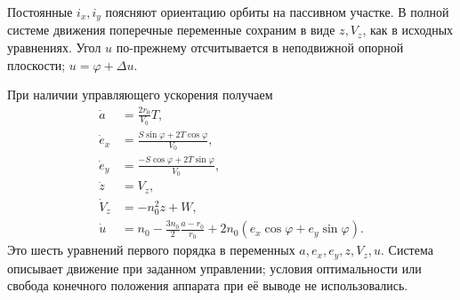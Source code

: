 \documentclass[a4paper,11pt]{article}
\numberwithin{equation}{section}
\theoremstyle{remark}
\begin{document}
Постоянные $i_x,i_y$ поясняют ориентацию орбиты на пассивном участке.
В полной системе движения поперечные переменные сохраним в виде
$z,V_z$, как в исходных уравнениях. Угол $u$ по-прежнему отсчитывается
в неподвижной опорной плоскости; $u=\varphi+\Delta u$.

При наличии управляющего ускорения получаем
\begin{equation}
 \boxed{\begin{aligned}
  \dot a&=\frac{2r_0}{V_0}T,\\
  \dot e_x&=\frac{S\sin\varphi+2T\cos\varphi}{V_0},\\
  \dot e_y&=\frac{-S\cos\varphi+2T\sin\varphi}{V_0},\\
  \dot z&=V_z,\\
  \dot V_z&=-n_0^2z+W,\\
  \dot u&=n_0-\frac{3n_0}{2}\frac{a-r_0}{r_0}
                  +2n_0(e_x\cos\varphi+e_y\sin\varphi).
 \end{aligned}}
 \label{eq:linear-element-dynamics}
\end{equation}
Это шесть уравнений первого порядка в переменных
$a,e_x,e_y,z,V_z,u$. Система описывает движение при заданном
управлении; условия оптимальности или свобода конечного положения аппарата
при её выводе не использовались.
\end{document}
